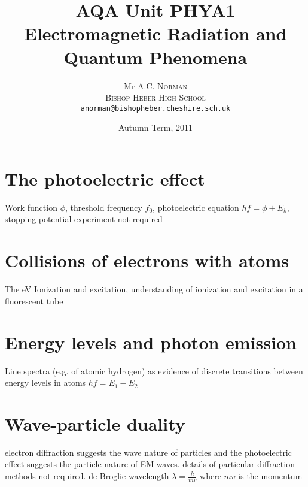 \documentclass[a4paper,12pt]{article}
\title{AQA Unit PHYA1\\Electromagnetic Radiation and Quantum Phenomena}
\author{Mr \textsc{A.C. Norman}\\
\textsc{Bishop Heber High School}
\\ \texttt{anorman@bishopheber.cheshire.sch.uk}}
\date{Autumn Term, 2011}
\begin{document}
\begin{titlepage}
\maketitle

\thispagestyle{empty}
\enlargethispage{4cm}
	
\begin{center}
\end{center}

\begin{flushright}
\end{flushright}
\end{titlepage}

\clearpage

\section{The photoelectric effect}
Work function $\phi$, threshold frequency $f_{0}$, photoelectric equation $hf=\phi+E_{k}$, stopping potential experiment not required

\section{Collisions of electrons with atoms}
The eV
Ionization and excitation, understanding of ionization and excitation in a fluorescent tube



\section{Energy levels and photon emission}


Line spectra (e.g. of atomic hydrogen) as evidence of discrete transitions between energy levels in atoms
$hf=E_{1}-E_{2}$

\section{Wave-particle duality}
electron diffraction suggests the wave nature of particles and the photoelectric effect suggests the particle nature of EM waves.  details of particular diffraction methods not required.%
de Broglie wavelength $\lambda=\frac{h}{mv}$
where $mv$ is the momentum
\end{document}
